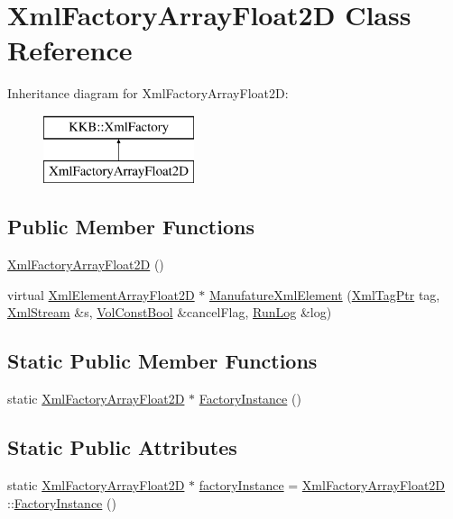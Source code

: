 \hypertarget{class_xml_factory_array_float2_d}{}\section{Xml\+Factory\+Array\+Float2D Class Reference}
\label{class_xml_factory_array_float2_d}
Inheritance diagram for Xml\+Factory\+Array\+Float2D\+:\begin{figure}[H]
\begin{center}
\leavevmode
\includegraphics[height=2.000000cm]{class_xml_factory_array_float2_d}
\end{center}
\end{figure}
\subsection*{Public Member Functions}
\begin{DoxyCompactItemize}
\item 
\hyperlink{class_xml_factory_array_float2_d_a342851e22a5e6de5ba95787515b2c3f8}{Xml\+Factory\+Array\+Float2D} ()
\item 
virtual \hyperlink{class_k_k_b_1_1_xml_element_array_float2_d}{Xml\+Element\+Array\+Float2D} $\ast$ \hyperlink{class_xml_factory_array_float2_d_abbe04839bde72b0512892d5b5e44a1ed}{Manufature\+Xml\+Element} (\hyperlink{namespace_k_k_b_a9253a3ea8a5da18ca82be4ca2b390ef0}{Xml\+Tag\+Ptr} tag, \hyperlink{class_k_k_b_1_1_xml_stream}{Xml\+Stream} \&s, \hyperlink{namespace_k_k_b_a7d390f568e2831fb76b86b56c87bf92f}{Vol\+Const\+Bool} \&cancel\+Flag, \hyperlink{class_k_k_b_1_1_run_log}{Run\+Log} \&log)
\end{DoxyCompactItemize}
\subsection*{Static Public Member Functions}
\begin{DoxyCompactItemize}
\item 
static \hyperlink{class_xml_factory_array_float2_d}{Xml\+Factory\+Array\+Float2D} $\ast$ \hyperlink{class_xml_factory_array_float2_d_a6dd0f8175ba292b109c7ebc125541f1b}{Factory\+Instance} ()
\end{DoxyCompactItemize}
\subsection*{Static Public Attributes}
\begin{DoxyCompactItemize}
\item 
static \hyperlink{class_xml_factory_array_float2_d}{Xml\+Factory\+Array\+Float2D} $\ast$ \hyperlink{class_xml_factory_array_float2_d_a45879218aa23c8e4495f003d9e6049ce}{factory\+Instance} = \hyperlink{class_xml_factory_array_float2_d}{Xml\+Factory\+Array\+Float2D} \+::\hyperlink{class_xml_factory_array_float2_d_a6dd0f8175ba292b109c7ebc125541f1b}{Factory\+Instance} ()
\end{DoxyCompactItemize}


